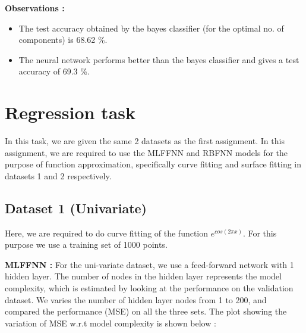 \documentclass{article}
\begin{document}
\begin{flushleft}
\textbf{Observations :}
\begin{itemize}
\item The test accuracy obtained by the bayes classifier (for the optimal no. of components) is 68.62 \%.
\item The neural network performs better than the bayes classifier and gives a test accuracy of 69.3 \%. 
\end{itemize}


\end{flushleft}
\newpage



\section{Regression task}
In this task, we are given the same 2 datasets as the first assignment. In this assignment, we are required to use the MLFFNN and RBFNN models for the purpose of function approximation, specifically curve fitting and surface fitting in datasets 1 and 2 respectively.




\subsection{Dataset 1 (Univariate)}
\begin{flushleft}
Here, we are required to do curve fitting of the function $e^{cos(2 \pi x)}$. For this purpose we use a training set of 1000 points.



\end{flushleft}


\begin{flushleft}

\textbf{MLFFNN :}
For the uni-variate dataset, we use a feed-forward network with 1 hidden layer. The number of nodes in the hidden layer represents the model complexity, which is estimated by looking at the performance on the validation dataset. We varies the number of hidden layer nodes from 1 to 200, and compared the performance   (MSE) on all the three sets. The plot showing the variation of MSE w.r.t model complexity is shown below :

\end{flushleft}
\end{document}
